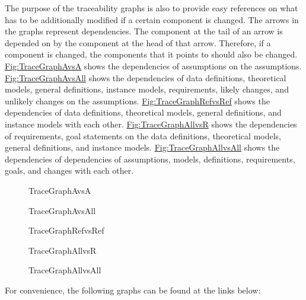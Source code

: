 \documentclass[12pt]{article}
\begin{document}
The purpose of the traceability graphs is also to provide easy references on what has to be additionally modified if a certain component is changed. The arrows in the graphs represent dependencies. The component at the tail of an arrow is depended on by the component at the head of that arrow. Therefore, if a component is changed, the components that it points to should also be changed. \hyperref[Figure:TraceGraphAvsA]{Fig:TraceGraphAvsA} shows the dependencies of assumptions on the assumptions. \hyperref[Figure:TraceGraphAvsAll]{Fig:TraceGraphAvsAll} shows the dependencies of data definitions, theoretical models, general definitions, instance models, requirements, likely changes, and unlikely changes on the assumptions. \hyperref[Figure:TraceGraphRefvsRef]{Fig:TraceGraphRefvsRef} shows the dependencies of data definitions, theoretical models, general definitions, and instance models with each other. \hyperref[Figure:TraceGraphAllvsR]{Fig:TraceGraphAllvsR} shows the dependencies of requirements, goal statements on the data definitions, theoretical models, general definitions, and instance models. \hyperref[Figure:TraceGraphAllvsAll]{Fig:TraceGraphAllvsAll} shows the dependencies of dependencies of assumptions, models, definitions, requirements, goals, and changes with each other.

\begin{figure}
\begin{center}

\caption{TraceGraphAvsA}
\label{Figure:TraceGraphAvsA}
\end{center}
\end{figure}
\begin{figure}
\begin{center}

\caption{TraceGraphAvsAll}
\label{Figure:TraceGraphAvsAll}
\end{center}
\end{figure}
\begin{figure}
\begin{center}

\caption{TraceGraphRefvsRef}
\label{Figure:TraceGraphRefvsRef}
\end{center}
\end{figure}
\begin{figure}
\begin{center}

\caption{TraceGraphAllvsR}
\label{Figure:TraceGraphAllvsR}
\end{center}
\end{figure}
\begin{figure}
\begin{center}

\caption{TraceGraphAllvsAll}
\label{Figure:TraceGraphAllvsAll}
\end{center}
\end{figure}
For convenience, the following graphs can be found at the links below:
\end{document}
